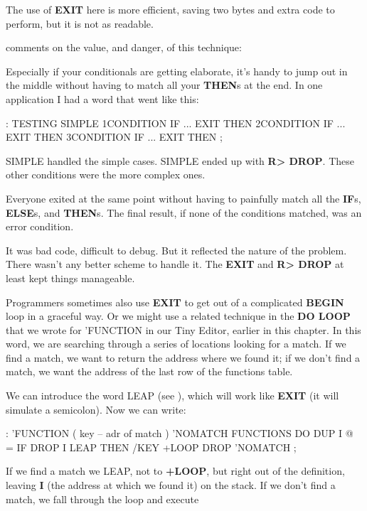 The use of \textbf{EXIT} here is more efficient, saving two bytes and extra
code to perform, but it is not as readable.

\begin{interview}
 comments on the value, and danger, of this technique:
\begin{tfquot}
Especially if your conditionals are getting elaborate, it's handy to jump out
in the middle without having to match all your \textbf{THEN}s at the end. In one
application I had a word that went like this:

\begin{Code}
: TESTING
   SIMPLE  1CONDITION IF ... EXIT THEN
           2CONDITION IF ... EXIT THEN
           3CONDITION IF ... EXIT THEN ;
\end{Code}
SIMPLE handled the simple cases. SIMPLE ended up with \textbf{R> DROP}.
These other conditions were the more complex ones.

Everyone exited at the same point without having to painfully match all
the \textbf{IF}s, \textbf{ELSE}s, and \textbf{THEN}s. The final result, if none of the
conditions matched, was an error condition.

It was bad code, difficult to debug. But it reflected the nature of the
problem. There wasn't any better scheme to handle it. The \textbf{EXIT} and
\textbf{R> DROP} at least kept things manageable.
\end{tfquot}
\end{interview}
Programmers sometimes also use \textbf{EXIT} to get out of a complicated
\textbf{BEGIN} loop in a graceful way. Or we might use a related technique in the
\textbf{DO LOOP} that we wrote for 'FUNCTION in our Tiny Editor, earlier in
this chapter. In this word, we are searching through a series of locations
looking for a match. If we find a match, we want to return the address
where we found it; if we don't find a match, we want the address of the
last row of the functions table.

We can introduce the word LEAP (see ), which will work
like \textbf{EXIT} (it will simulate a semicolon). Now we can write:

\begin{Code}
: 'FUNCTION  ( key -- adr of match )
   'NOMATCH FUNCTIONS DO  DUP  I @ =  IF  DROP I LEAP
   THEN  /KEY +LOOP  DROP  'NOMATCH ;
\end{Code}
If we find a match we LEAP, not to \textbf{+LOOP}, but right out of the definition,
leaving \textbf{I} (the address at which we found it) on the stack. If we don't
find a match, we fall through the loop and execute


